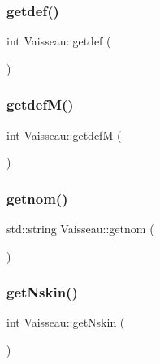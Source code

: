 \subsubsection{\texorpdfstring{getdef()}{getdef()}}
{\footnotesize\ttfamily int Vaisseau\+::getdef (\begin{DoxyParamCaption}{ }\end{DoxyParamCaption})}

\mbox{\label{class_vaisseau_aa983d5040f7c19a9dfcb907618fda321}} 
\subsubsection{\texorpdfstring{getdef\+M()}{getdefM()}}
{\footnotesize\ttfamily int Vaisseau\+::getdefM (\begin{DoxyParamCaption}{ }\end{DoxyParamCaption})}

\mbox{\label{class_vaisseau_acbe2e5af7beda381d21392d4eb539761}} 
\subsubsection{\texorpdfstring{getnom()}{getnom()}}
{\footnotesize\ttfamily std\+::string Vaisseau\+::getnom (\begin{DoxyParamCaption}{ }\end{DoxyParamCaption})}

\mbox{\label{class_vaisseau_aaecdafade1e84272e58cc97558f7c5c3}} 
\subsubsection{\texorpdfstring{get\+Nskin()}{getNskin()}}
{\footnotesize\ttfamily int Vaisseau\+::get\+Nskin (\begin{DoxyParamCaption}{ }\end{DoxyParamCaption})}

\mbox{\label{class_vaisseau_ae8e571f83be3f2bc1b961841f872265e}} 
